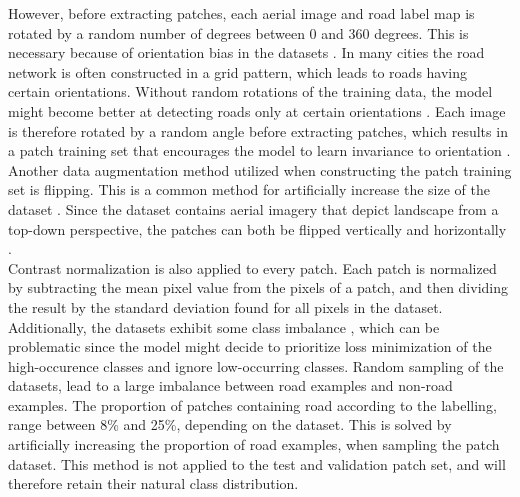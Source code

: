 However, before extracting patches, each aerial image and road label map is rotated by a random number of degrees between 0 and 360 degrees. This is necessary because of orientation bias in the datasets . In many cities the road network is often constructed in a grid pattern, which leads to roads having certain orientations. Without random rotations of the training data, the model might become better at detecting roads only at certain orientations \citep{Mnih_roads_high_res_aerial_images}. Each image is therefore rotated by a random angle before extracting patches, which results in a patch training set that encourages the model to learn invariance to orientation .\\

Another data augmentation method utilized when constructing the patch training set is flipping. This is a common method for artificially increase the size of the dataset \citep{Krizhevsky_imagenet}. Since the dataset contains aerial imagery that depict landscape from a top-down perspective, the patches can both be flipped vertically and horizontally .\\

Contrast normalization is also applied to every patch. Each patch is normalized by subtracting the mean pixel value from the pixels of a patch, and then dividing the result by the standard deviation found for all pixels in the dataset.\\

Additionally, the datasets exhibit some class imbalance \citep{Japkowicz_class_imbalance}, which can be problematic since the model might decide to prioritize loss minimization of the high-occurence classes and ignore low-occurring classes. Random sampling of the datasets, lead to a large imbalance between road examples and non-road examples. The proportion of patches containing road according to the labelling, range between 8\% and 25\%, depending on the dataset. This is solved by artificially increasing the proportion of road examples, when sampling the patch dataset. This method is not applied to the test and validation patch set, and will therefore retain their natural class distribution.\\
